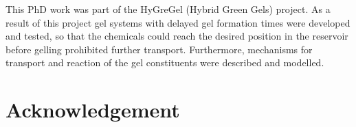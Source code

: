 This PhD work was part of the HyGreGel (Hybrid Green Gels) project. As a result of this project gel systems with delayed gel formation times were developed and tested, so that the chemicals could reach the desired position in the reservoir before gelling prohibited further transport. Furthermore, mechanisms for transport and reaction of the gel constituents were described and modelled. 



\clearpage{\thispagestyle{empty}\cleardoublepage}
\chapter*{Acknowledgement}
{\par}